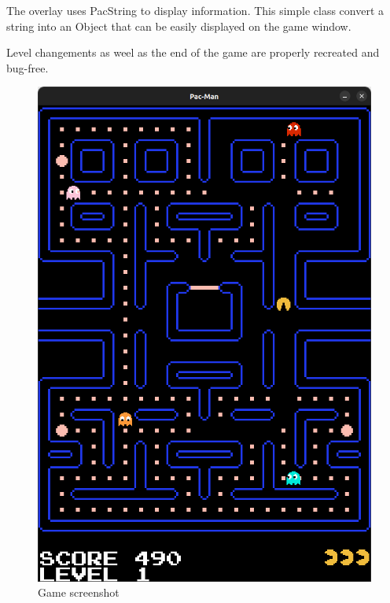 The overlay uses \textsf{PacString} to display information. This simple class convert a string into an \textsf{Object} that can be easily displayed on the game window.

Level changements as weel as the end of the game are properly recreated and bug-free.

\begin{figure}
    \center
    \includegraphics[scale=.25]{img/game.png}
    \caption{Game screenshot}
    \label{game}
\end{figure}